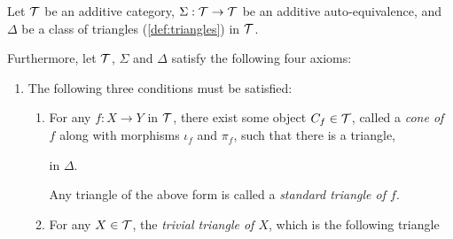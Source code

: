 \begin{definition}
    \label{def:triangulated_category}
    Let \( {\mathcal{T}} \) be an additive category, \( \Sigma: {\mathcal{T}} \to {\mathcal{T}} \) be an additive auto-equivalence, and \( \Delta \) be a class of triangles (\autoref{def:triangles}) in \( {\mathcal{T}} \).

    Furthermore, let \( {\mathcal{T}} \), \( \Sigma \) and \( \Delta \) satisfy the following four axioms:
    \begin{enumerate}[label={(\bfseries TR\arabic*)}]
        \item {
            The following three conditions must be satisfied:
            \begin{enumerate}
                \item {
                    For any \( f: X \to Y \) in \( {\mathcal{T}} \), there exist some object \( C_f \in {\mathcal{T}} \), called a \emph{cone of \( f \)} along with morphisms \( \iota_f \) and \( \pi_f \), such that there is a triangle,
                    \begin{center}
                    \end{center}
                    in \( \Delta \).

                    Any triangle of the above form is called a \emph{standard triangle of \( f \)}.
                }
                \item {
                    For any \( X \in {\mathcal{T}} \), the \emph{trivial triangle of \( X \)}, which is the following triangle
                    \begin{center}
\end{center}}
\end{enumerate}}
\end{enumerate}
\end{definition}
